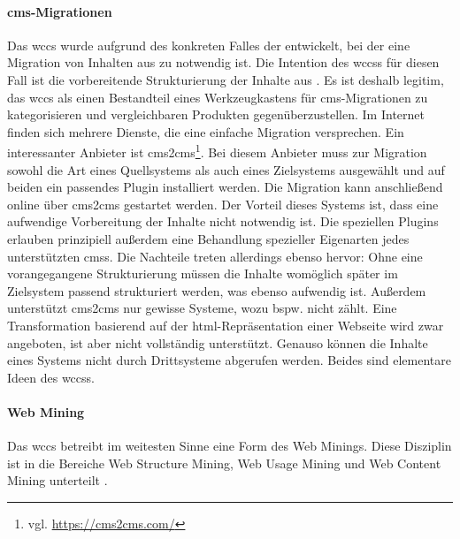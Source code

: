         \paragraph*{\gls{cms}-Migrationen}
        Das \gls{wccs} wurde aufgrund des konkreten Falles der {\fernUni}
        entwickelt, bei der eine Migration von Inhalten aus {\wordpress} zu {\imperia} notwendig ist.
        Die Intention des \glspl{wccs} für diesen Fall ist die vorbereitende Strukturierung der
        Inhalte aus {\wordpress}.
        Es ist deshalb legitim, das \gls{wccs} als einen Bestandteil eines Werkzeugkastens
        für \gls{cms}-Migrationen zu kategorisieren und vergleichbaren Produkten gegenüberzustellen.
        Im Internet finden sich mehrere Dienste, die eine einfache Migration versprechen.
        Ein interessanter Anbieter ist cms2cms\footnote{vgl. \url{https://cms2cms.com/}}.
        Bei diesem Anbieter muss zur Migration sowohl die Art eines Quellsystems als auch eines Zielsystems ausgewählt
        und auf beiden ein passendes Plugin installiert werden.
        Die Migration kann anschließend online über cms2cms gestartet werden.
        Der Vorteil dieses Systems ist,
        dass eine aufwendige Vorbereitung der Inhalte nicht notwendig ist.
        Die speziellen Plugins erlauben prinzipiell außerdem eine Behandlung spezieller
        Eigenarten jedes unterstützten \glspl{cms}.
        Die Nachteile treten allerdings ebenso hervor: Ohne eine vorangegangene Strukturierung
        müssen die Inhalte womöglich später im Zielsystem passend strukturiert werden,
        was ebenso aufwendig ist.
        Außerdem unterstützt cms2cms nur gewisse Systeme,
        wozu {\imperia} bspw. nicht zählt.
        Eine Transformation basierend auf der \gls{html}-Repräsentation einer Webseite wird zwar angeboten,
        ist aber nicht vollständig unterstützt.
        Genauso können die Inhalte eines Systems nicht durch Drittsysteme abgerufen werden.
        Beides sind elementare Ideen des \glspl{wccs}.

        \paragraph*{Web Mining}
        Das \gls{wccs} betreibt im weitesten Sinne eine Form des Web Minings.
        Diese Disziplin ist in die Bereiche Web Structure Mining,
        Web Usage Mining und Web Content Mining unterteilt
        \cite{markov:webMining}.

